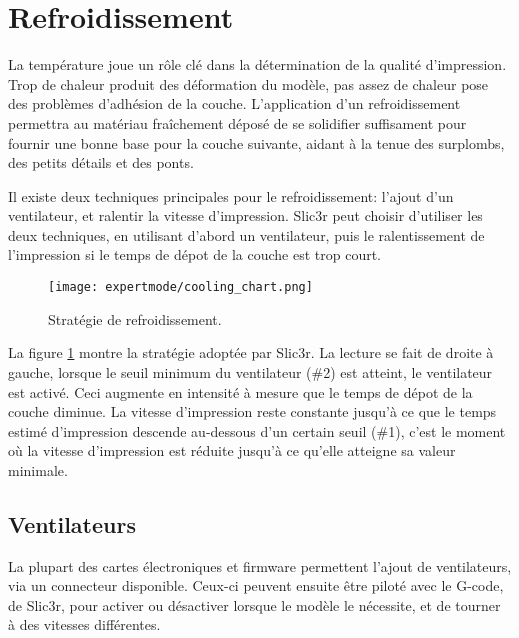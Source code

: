 
\section{Refroidissement} %
\label{sec:cooling}

La temp\'erature joue un r\^ole cl\'e dans la d\'etermination de la qualit\'e d'impression. Trop de chaleur produit des d\'eformation du mod\`ele, pas assez de chaleur pose des probl\`emes d'adh\'esion de la couche. L'application d'un refroidissement permettra au mat\'eriau fra\^ichement d\'epos\'e de se solidifier suffisament pour fournir une bonne base pour la couche suivante, aidant \`a la tenue des surplombs, des petits d\'etails et des ponts.

Il existe deux techniques principales pour le refroidissement: l'ajout d'un ventilateur, et ralentir la vitesse d'impression. Slic3r peut choisir d'utiliser les deux techniques, en utilisant d'abord un ventilateur, puis le ralentissement de l'impression si le temps de d\'epot de la couche est trop court.

\begin{figure}[H]
\centering
\texttt{[image: expertmode/cooling\_chart.png]}
\caption{Strat\'egie de refroidissement.}
\label{fig:cooling_chart}
\end{figure}

La figure \ref{fig:cooling_chart} montre la strat\'egie adopt\'ee par Slic3r. La lecture se fait de droite \`a gauche, lorsque le seuil minimum du ventilateur (\#2) est atteint, le ventilateur est activ\'e. Ceci augmente en intensit\'e \`a mesure que le temps de d\'epot de la couche diminue. La vitesse d'impression reste constante jusqu'\`a ce que le temps estim\'e d'impression descende au-dessous d'un certain seuil (\#1), c'est le moment o\`u la vitesse d'impression est r\'eduite jusqu'\`a ce qu'elle atteigne sa valeur minimale.

\subsection{Ventilateurs} %
\label{sub:fans}
La plupart des cartes \'electroniques et firmware permettent l'ajout de ventilateurs, via un connecteur disponible. Ceux-ci peuvent ensuite \^etre pilot\'e avec le G-code, de Slic3r, pour activer ou d\'esactiver lorsque le mod\`ele le n\'ecessite, et de tourner \`a des vitesses diff\'erentes.

